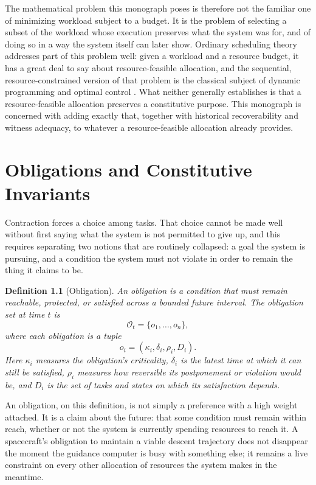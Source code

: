 \documentclass[11pt]{report}
\newtheorem{definition}{Definition}[chapter]
\begin{document}
The mathematical problem this monograph poses is therefore not the familiar one of minimizing workload subject to a budget. It is the problem of selecting a subset of the workload whose execution preserves what the system was for, and of doing so in a way the system itself can later show. Ordinary scheduling theory addresses part of this problem well: given a workload and a resource budget, it has a great deal to say about resource-feasible allocation, and the sequential, resource-constrained version of that problem is the classical subject of dynamic programming and optimal control \cite{bertsekas2017}. What neither generally establishes is that a resource-feasible allocation preserves a constitutive purpose. This monograph is concerned with adding exactly that, together with historical recoverability and witness adequacy, to whatever a resource-feasible allocation already provides.

\chapter{Obligations and Constitutive Invariants}

Contraction forces a choice among tasks. That choice cannot be made well without first saying what the system is not permitted to give up, and this requires separating two notions that are routinely collapsed: a goal the system is pursuing, and a condition the system must not violate in order to remain the thing it claims to be.

\begin{definition}[Obligation]
An obligation is a condition that must remain reachable, protected, or satisfied across a bounded future interval. The obligation set at time $t$ is
\[
\mathcal O_t = \{o_1, \ldots, o_n\},
\]
where each obligation is a tuple
\[
o_i = (\kappa_i, \delta_i, \rho_i, D_i).
\]
Here $\kappa_i$ measures the obligation's criticality, $\delta_i$ is the latest time at which it can still be satisfied, $\rho_i$ measures how reversible its postponement or violation would be, and $D_i$ is the set of tasks and states on which its satisfaction depends.
\end{definition}

An obligation, on this definition, is not simply a preference with a high weight attached. It is a claim about the future: that some condition must remain within reach, whether or not the system is currently spending resources to reach it. A spacecraft's obligation to maintain a viable descent trajectory does not disappear the moment the guidance computer is busy with something else; it remains a live constraint on every other allocation of resources the system makes in the meantime.
\end{document}
